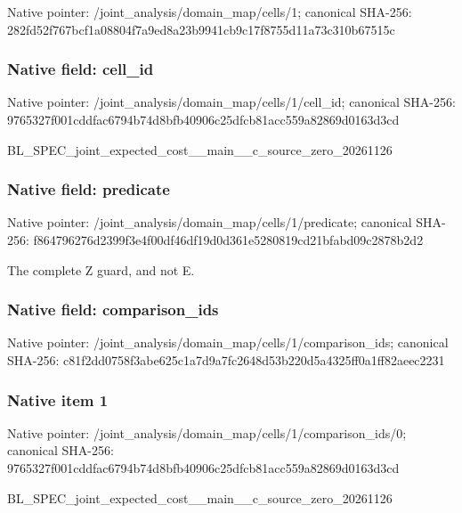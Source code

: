 \documentclass[10pt,a4paper]{article}
\begin{document}
Native pointer: /joint\_analysis/domain\_map/cells/1; canonical SHA-256: 282fd52f767bcf1a08804f7a\allowbreak{}9ed8a23b9941cb9c17f8755d\allowbreak{}11a73c310b67515c



\subsubsection{Native field: cell\_id}


Native pointer: /joint\_analysis/domain\_m\allowbreak{}ap/cells/1/cell\_id; canonical SHA-256: 9765327f001cddfac6794b74\allowbreak{}d8bfb40906c25dfcb81acc55\allowbreak{}9a82869d0163d3cd


BL\_SPEC\_joint\_expected\_c\allowbreak{}ost\_\_main\_\_c\_source\_zero\allowbreak{}\_20261126


\subsubsection{Native field: predicate}


Native pointer: /joint\_analysis/domain\_m\allowbreak{}ap/cells/1/predicate; canonical SHA-256: f864796276d2399f3e4f00df\allowbreak{}46df19d0d361e5280819cd21\allowbreak{}bfabd09c2878b2d2


The complete Z guard, and not E.


\subsubsection{Native field: comparison\_ids}


Native pointer: /joint\_analysis/domain\_m\allowbreak{}ap/cells/1/comparison\_id\allowbreak{}s; canonical SHA-256: c81f2dd0758f3abe625c1a7d\allowbreak{}9a7fc2648d53b220d5a4325f\allowbreak{}f0a1ff82aeec2231



\subsubsection{Native item 1}


Native pointer: /joint\_analysis/domain\_m\allowbreak{}ap/cells/1/comparison\_id\allowbreak{}s/0; canonical SHA-256: 9765327f001cddfac6794b74\allowbreak{}d8bfb40906c25dfcb81acc55\allowbreak{}9a82869d0163d3cd


BL\_SPEC\_joint\_expected\_c\allowbreak{}ost\_\_main\_\_c\_source\_zero\allowbreak{}\_20261126
\end{document}

